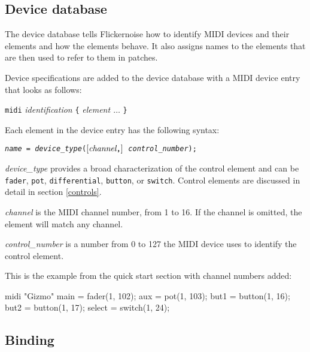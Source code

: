 \documentclass[11pt,a4paper]{article}
\newenvironment{expose}{\vskip3mm\qquad\begin{raggedright}}{%
\end{raggedright}\vskip3mm}
\begin{document}


\subsection{Device database}

The device database tells Flickernoise how to identify MIDI
devices and their elements and how the elements behave. It also
assigns names to the elements that are then used to refer to
them in patches.

Device specifications are added to the device database with 
a MIDI device entry that looks as follows:

\begin{expose}
{\tt midi} {\em identification} \verb"{" {\em element $\ldots$} \verb"}"
\end{expose}

Each element in the device entry has the following syntax:

\begin{expose}
{\tt {\em name} =
  {\em device\_type}($\left[\hbox{\em channel}\verb","\right]$
  {\em control\_number});}
\end{expose}

{\em device\_type} provides a broad characterization of the control
element and can be {\tt fader}, {\tt pot}, {\tt differential},
{\tt button}, or {\tt switch}. Control elements are discussed in
detail in section \ref{controls}.

{\em channel} is the MIDI channel number, from 1 to 16. If the channel
is omitted, the element will match any channel.

{\em control\_number} is a number from 0 to 127 the MIDI device uses
to identify the control element.

This is the example from the quick start section with channel numbers
added:

\begin{listing}{1}
midi "Gizmo" {
	main = fader(1, 102);
	aux = pot(1, 103);
	but1 = button(1, 16);
	but2 = button(1, 17);
	select = switch(1, 24);
}
\end{listing}




\figbind

\subsection{Binding}
\label{binding}
\end{document}
